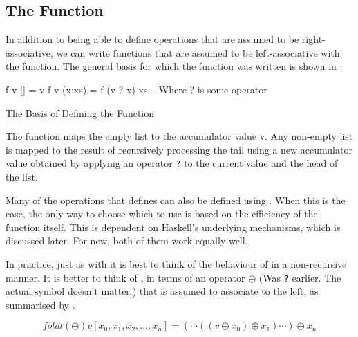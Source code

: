 \subsection{The \texorpdfstring{}{\texttt{foldl}} Function}\label{subsec:Foldl_Function}
In addition to being able to define operations that are assumed to be right-associative, we can write functions that are assumed to be left-associative with the  function.
The general basis for which the  function was written is shown in .

\begin{listing}[h!tbp]
\begin{haskellsource}
f v [] = v
f v (x:xs) = f (v ? x) xs
-- Where ? is some operator
\end{haskellsource}
\caption{The Basis of Defining the  Function}
\label{lst:Foldl_Basis}
\end{listing}

The function maps the empty list to the accumulator value v.
Any non-empty list is mapped to the result of recursively processing the tail using a new accumulator value obtained by applying an operator \texttt{?} to the current value and the head of the list.

Many of the operations that  defines can also be defined using .
When this is the case, the only way to choose which to use is based on the efficiency of the function itself.
This is dependent on Haskell's underlying mechanisms, which is discussed later.
For now, both of them work equally well.

In practice, just as with  it is best to think of the behaviour of  in a non-recursive manner.
It is better to think of , in terms of an operator $\oplus$ (Was \texttt{?} earlier. The actual symbol doesn't matter.) that is assumed to associate to the left, as summarised by .

\begin{equation}\label{eq:General_foldl_Operation}
  foldl (\oplus) v [x_{0}, x_{1}, x_{2}, \ldots, x_{n}] = (\cdots ((v \oplus x_{0}) \oplus x_{1}) \cdots) \oplus x_{n}
\end{equation}

